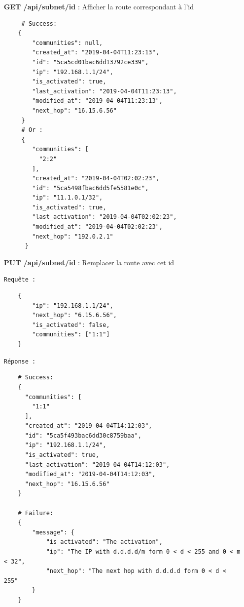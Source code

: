 \begin{itemize}
\begin{verbatim}
    # Failure:
    {
        "message": {
            "ip": "The IP with d.d.d.d/m form 0 < d < 255 and 0 < m < 32",
            "next_hop": "The next hop with d.d.d.d form 0 < d < 255"
        }
    }
    \end{verbatim}
    
    \item [\textbf{GET /api/subnet/id}] : Afficher la route correspondant à l'id
    
    \begin{verbatim}
     # Success:
    {
        "communities": null, 
        "created_at": "2019-04-04T11:23:13", 
        "id": "5ca5cd01bac6dd13792ce339", 
        "ip": "192.168.1.1/24", 
        "is_activated": true, 
        "last_activation": "2019-04-04T11:23:13", 
        "modified_at": "2019-04-04T11:23:13", 
        "next_hop": "16.15.6.56"
     }
     # Or :
     {
        "communities": [
          "2:2"
        ], 
        "created_at": "2019-04-04T02:02:23", 
        "id": "5ca5498fbac6dd5fe5581e0c", 
        "ip": "11.1.0.1/32", 
        "is_activated": true, 
        "last_activation": "2019-04-04T02:02:23", 
        "modified_at": "2019-04-04T02:02:23", 
        "next_hop": "192.0.2.1"
      }
    \end{verbatim}

    \item [\textbf{PUT /api/subnet/id}] : Remplacer la route avec cet id
    
    \texttt{Requête :}
    \begin{verbatim}
    {
        "ip": "192.168.1.1/24", 
        "next_hop": "6.15.6.56", 
        "is_activated": false, 
        "communities": ["1:1"]
    }
    \end{verbatim}
    
    \texttt{Réponse :}
    \begin{verbatim}
    # Success:
    {
      "communities": [
        "1:1"
      ], 
      "created_at": "2019-04-04T14:12:03", 
      "id": "5ca5f493bac6dd30c8759baa", 
      "ip": "192.168.1.1/24", 
      "is_activated": true, 
      "last_activation": "2019-04-04T14:12:03", 
      "modified_at": "2019-04-04T14:12:03", 
      "next_hop": "16.15.6.56"
    }

    # Failure:
    {
        "message": {
            "is_activated": "The activation",
            "ip": "The IP with d.d.d.d/m form 0 < d < 255 and 0 < m < 32",
            "next_hop": "The next hop with d.d.d.d form 0 < d < 255"
        }
    }
    \end{verbatim}


\end{itemize}

